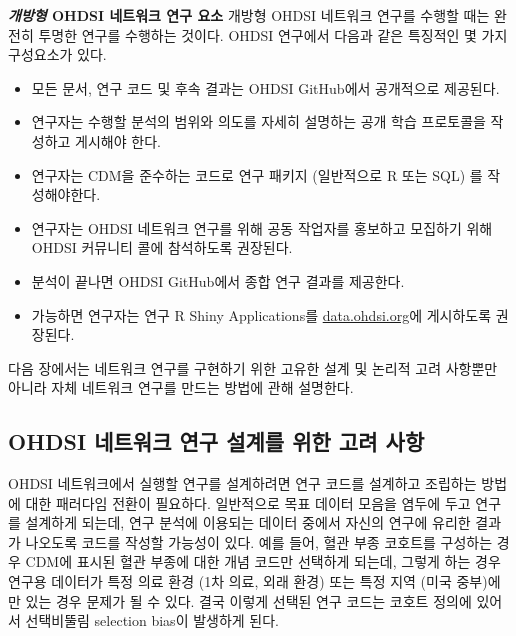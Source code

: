\documentclass[10.5pt]{book}
\providecommand{\tightlist}{%
  \setlength{\itemsep}{0pt}\setlength{\parskip}{0pt}}
\theoremstyle{definition}
\theoremstyle{definition}
\theoremstyle{definition}
\theoremstyle{remark}
\begin{document}
\textbf{\emph{개방형} OHDSI 네트워크 연구 요소} 개방형 OHDSI 네트워크
연구를 수행할 때는 완전히 투명한 연구를 수행하는 것이다. OHDSI 연구에서
다음과 같은 특징적인 몇 가지 구성요소가 있다.

\begin{itemize}
\tightlist
\item
  모든 문서, 연구 코드 및 후속 결과는 OHDSI GitHub에서 공개적으로
  제공된다.
\item
  연구자는 수행할 분석의 범위와 의도를 자세히 설명하는 공개 학습
  프로토콜을 작성하고 게시해야 한다.
\item
  연구자는 CDM을 준수하는 코드로 연구 패키지 (일반적으로 R 또는 SQL) 를
  작성해야한다.
\item
  연구자는 OHDSI 네트워크 연구를 위해 공동 작업자를 홍보하고 모집하기
  위해 OHDSI 커뮤니티 콜에 참석하도록 권장된다.
\item
  분석이 끝나면 OHDSI GitHub에서 종합 연구 결과를 제공한다.
\item
  가능하면 연구자는 연구 R Shiny Applications를
  \href{http://data.ohdsi.org}{data.ohdsi.org}에 게시하도록 권장된다.
\end{itemize}

다음 장에서는 네트워크 연구를 구현하기 위한 고유한 설계 및 논리적 고려
사항뿐만 아니라 자체 네트워크 연구를 만드는 방법에 관해 설명한다.

\subsection{OHDSI 네트워크 연구 설계를 위한 고려
사항}\label{ohdsi------}


OHDSI 네트워크에서 실행할 연구를 설계하려면 연구 코드를 설계하고
조립하는 방법에 대한 패러다임 전환이 필요하다. 일반적으로 목표 데이터
모음을 염두에 두고 연구를 설계하게 되는데, 연구 분석에 이용되는 데이터
중에서 자신의 연구에 유리한 결과가 나오도록 코드를 작성할 가능성이 있다.
예를 들어, 혈관 부종 코호트를 구성하는 경우 CDM에 표시된 혈관 부종에
대한 개념 코드만 선택하게 되는데, 그렇게 하는 경우 연구용 데이터가 특정
의료 환경 (1차 의료, 외래 환경) 또는 특정 지역 (미국 중부)에만 있는 경우
문제가 될 수 있다. 결국 이렇게 선택된 연구 코드는 코호트 정의에 있어서
선택비뚤림 selection bias이 발생하게 된다.
\end{document}
